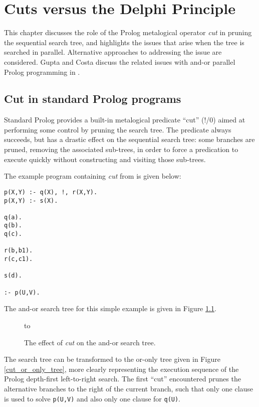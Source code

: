 \chapter{Cuts versus the Delphi Principle}
\label{cut}

This chapter discusses the role of the Prolog metalogical
operator \textit{cut} in pruning the sequential search tree, and
highlights the issues that arise when the tree is searched in
parallel.  Alternative approaches to addressing the issue are
considered.  Gupta and Costa discuss the related issues with and-or
parallel Prolog programming in \cite{GSC92}.

\section{Cut in standard Prolog programs} %


Standard Prolog \cite{DEDC96} provides a built-in metalogical 
predicate ``cut'' (!/0) aimed at performing some control by
pruning the search tree.  The predicate always succeeds, but has
a drastic effect on the sequential search tree: some branches are
pruned, removing the associated sub-trees, in order to force a predication
to execute quickly without constructing and visiting those
sub-trees.

The example program containing \textit{cut} from \cite{DEDC96} is
given below:
\begin{verbatim}
p(X,Y) :- q(X), !, r(X,Y).
p(X,Y) :- s(X).

q(a).
q(b).
q(c).

r(b,b1).
r(c,c1).

s(d).

:- p(U,V).
\end{verbatim}
The and-or search tree for this simple example is given in
Figure \ref{cut_and_or_tree}.

\begin{figure}[htbp]
\vspace{5mm} \hbox to 
\caption{The effect of \textit{cut} on the and-or search tree.}
\vspace{5mm}
\label{cut_and_or_tree}
\end{figure}

The search tree can be transformed to the or-only tree given in Figure \ref{cut_or_only_tree},
more clearly representing the execution sequence of the Prolog depth-first left-to-right 
search.  The first ``cut'' encountered prunes the alternative branches to the right of the
current branch, such that only one clause is used to solve \texttt{p(U,V)} and also only one
clause for \texttt{q(U)}.

